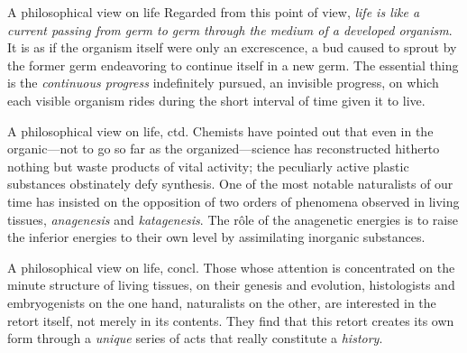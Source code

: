 \begin{frame}{A philosophical view on life}{}
{\small Regarded from this point of view, \emph{life is like a current passing from germ to germ through the medium of a developed organism}. It is as if the organism itself were only an excrescence, a bud caused to sprout by the former germ endeavoring to continue itself in a new germ. The essential thing is the \emph{continuous progress} indefinitely pursued, an invisible progress, on which each visible organism rides during the short interval of time given it to live.} \qquad\qquad {}
\end{frame}

\begin{frame}{A philosophical view on life, ctd.}{}
Chemists have pointed out that even in the organic---not to go so far as the organized---science has reconstructed hitherto nothing but waste products of vital activity; the peculiarly active plastic substances obstinately defy synthesis.  One of the most notable naturalists of our time has insisted on the opposition of two orders of phenomena observed in living tissues, \emph{anagenesis} and \emph{katagenesis}. The r\^{o}le of the anagenetic energies is to raise the inferior energies to their own level by assimilating inorganic substances.\quad {}
\end{frame}

\begin{frame}{A philosophical view on life, concl.}{}
Those whose attention is concentrated on the minute structure of living tissues, on their genesis and evolution, histologists and embryogenists on the one hand, naturalists on the other, are interested in the retort itself, not merely in its contents. They find that this retort creates its own form through a \emph{unique} series of acts that really constitute a \emph{history}. \quad {}
\end{frame}

